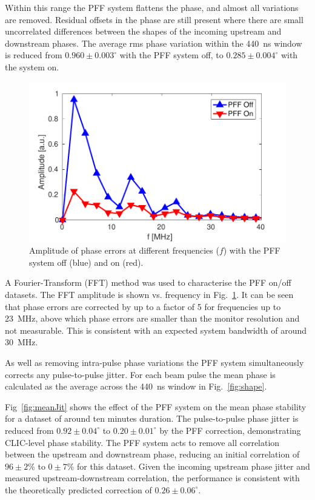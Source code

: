 \documentclass[%
 reprint,
 superscriptaddress,
 amsmath,
 amssymb,
 prl,
]{revtex4-1}
\begin{document}
Within this range the PFF system flattens the phase, 
and almost all variations are removed. Residual offsets in the phase are still 
present where there are small uncorrelated differences between the shapes of 
the incoming upstream and downstream phases. 
The average rms phase variation within the 440~ns window is reduced from 
\(0.960\pm0.003^\circ\) with the PFF system off, to \(0.285\pm0.004^\circ\) 
with the system on.

\begin{figure}
	\includegraphics[width=\columnwidth]{figs/fft}
	\caption{\label{fig:fft}Amplitude of phase errors at different frequencies 
		(\(f\)) with the PFF system off (blue) and on (red).}
\end{figure}

A Fourier-Transform (FFT) method was used to characterise the PFF on/off 
datasets. The FFT amplitude is shown vs. frequency in 
Fig.~\ref{fig:fft}. It can be seen that phase errors are corrected by up to a 
factor of 5 for frequencies up to 23~MHz, above which 
phase errors are smaller than the monitor resolution and not measurable. This 
is consistent with an expected system bandwidth of around 30~MHz.

As well as removing intra-pulse phase variations the PFF system simultaneously 
corrects any pulse-to-pulse jitter. For each beam pulse the mean phase is 
calculated as the average across the 440~ns window in Fig.~\ref{fig:shape}.

Fig~\ref{fig:meanJit} shows the effect of the PFF system on the mean 
phase stability for a dataset of around ten minutes duration.
The pulse-to-pulse phase jitter is reduced from  \(0.92\pm0.04^\circ\) to 
\(0.20\pm0.01^\circ\) by the PFF correction, demonstrating CLIC-level phase 
stability. 
The PFF system acts to remove all correlation between the upstream and 
downstream phase, reducing an initial correlation of \(96\pm2\%\) to 
\(0\pm7\%\) for this dataset.
Given the incoming upstream phase jitter and 
measured upstream-downstream correlation, the performance is consistent with 
the theoretically predicted correction of \(0.26\pm0.06^\circ\).
\end{document}
